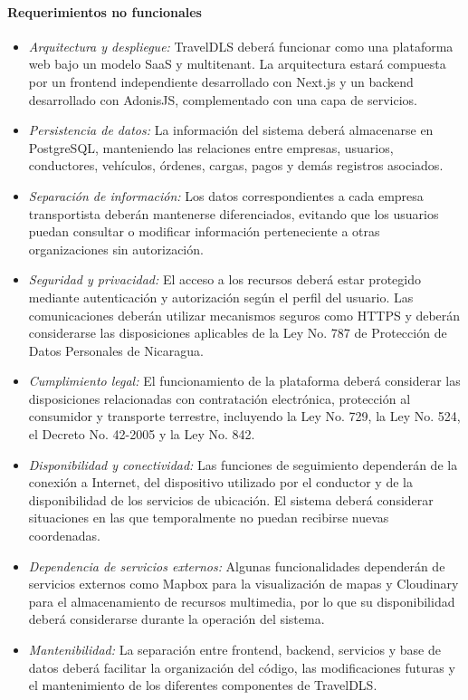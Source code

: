 \paragraph{Requerimientos no funcionales}

\begin{itemize}
	
	\item \textit{Arquitectura y despliegue:} TravelDLS deberá funcionar como una plataforma web bajo un modelo SaaS y multitenant. La arquitectura estará compuesta por un frontend independiente desarrollado con Next.js y un backend desarrollado con AdonisJS, complementado con una capa de servicios.
	
	\item \textit{Persistencia de datos:} La información del sistema deberá almacenarse en PostgreSQL, manteniendo las relaciones entre empresas, usuarios, conductores, vehículos, órdenes, cargas, pagos y demás registros asociados.
	
	\item \textit{Separación de información:} Los datos correspondientes a cada empresa transportista deberán mantenerse diferenciados, evitando que los usuarios puedan consultar o modificar información perteneciente a otras organizaciones sin autorización.
	
	\item \textit{Seguridad y privacidad:} El acceso a los recursos deberá estar protegido mediante autenticación y autorización según el perfil del usuario. Las comunicaciones deberán utilizar mecanismos seguros como HTTPS y deberán considerarse las disposiciones aplicables de la Ley No. 787 de Protección de Datos Personales de Nicaragua.
	
	\item \textit{Cumplimiento legal:} El funcionamiento de la plataforma deberá considerar las disposiciones relacionadas con contratación electrónica, protección al consumidor y transporte terrestre, incluyendo la Ley No. 729, la Ley No. 524, el Decreto No. 42-2005 y la Ley No. 842.
	
	\item \textit{Disponibilidad y conectividad:} Las funciones de seguimiento dependerán de la conexión a Internet, del dispositivo utilizado por el conductor y de la disponibilidad de los servicios de ubicación. El sistema deberá considerar situaciones en las que temporalmente no puedan recibirse nuevas coordenadas.
	
	\item \textit{Dependencia de servicios externos:} Algunas funcionalidades dependerán de servicios externos como Mapbox para la visualización de mapas y Cloudinary para el almacenamiento de recursos multimedia, por lo que su disponibilidad deberá considerarse durante la operación del sistema.
	
	\item \textit{Mantenibilidad:} La separación entre frontend, backend, servicios y base de datos deberá facilitar la organización del código, las modificaciones futuras y el mantenimiento de los diferentes componentes de TravelDLS.
	
\end{itemize}

